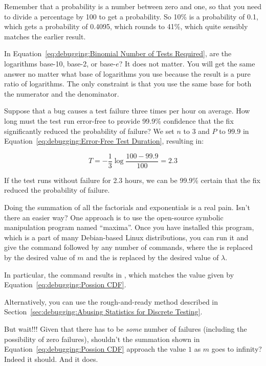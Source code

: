 \begin{enumerate}
	Remember that a probability is a number between zero and one,
	so that you need to divide a percentage by 100 to get a
	probability.
	So 10\% is a probability of 0.1, which gets a probability
	of 0.4095, which rounds to 41\%, which quite sensibly
	matches the earlier result.

\QuickQ{}
	In Equation~\ref{eq:debugging:Binomial Number of Tests Required},
	are the logarithms base-10, base-2, or base-$e$?
\QuickA{}
	It does not matter.
	You will get the same answer no matter what base of logarithms
	you use because the result is a pure ratio of logarithms.
	The only constraint is that you use the same base for both
	the numerator and the denominator.

\QuickQ{}
	Suppose that a bug causes a test failure three times per hour
	on average.
	How long must the test run error-free to provide 99.9\%
	confidence that the fix significantly reduced the probability
	of failure?
\QuickA{}
	We set $n$ to $3$ and $P$ to $99.9$ in
	Equation~\ref{eq:debugging:Error-Free Test Duration}, resulting in:

	\begin{equation}
		T = - \frac{1}{3} \log \frac{100 - 99.9}{100} = 2.3
	\end{equation}

	If the test runs without failure for 2.3 hours, we can be 99.9\%
	certain that the fix reduced the probability of failure.

\QuickQ{}
	Doing the summation of all the factorials and exponentials
	is a real pain.
	Isn't there an easier way?
\QuickA{}
	One approach is to use the open-source symbolic manipulation
	program named ``maxima''.
	Once you have installed this program, which is a part of many
	Debian-based Linux distributions, you can run it and give the
	 command followed by any number of
	 commands, where the 
	is replaced by the desired value of $m$ and the 
	is replaced by the desired value of $\lambda$.

	In particular, the  command
	results in , which matches the value
	given by Equation~\ref{eq:debugging:Possion CDF}.

	Alternatively, you can use the rough-and-ready method described in
	Section~\ref{sec:debugging:Abusing Statistics for Discrete Testing}.

\QuickQ{}
	But wait!!!
	Given that there has to be \emph{some} number of failures
	(including the possibility of zero failures),
	shouldn't the summation shown in
	Equation~\ref{eq:debugging:Possion CDF}
	approach the value $1$ as $m$ goes to infinity?
\QuickA{}
	Indeed it should.
	And it does.


\end{enumerate}
